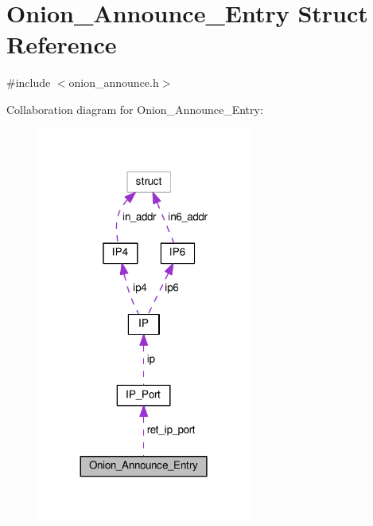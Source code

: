 \hypertarget{struct_onion___announce___entry}{\section{Onion\+\_\+\+Announce\+\_\+\+Entry Struct Reference}
\label{struct_onion___announce___entry}
}


{\ttfamily \#include $<$onion\+\_\+announce.\+h$>$}



Collaboration diagram for Onion\+\_\+\+Announce\+\_\+\+Entry\+:
\nopagebreak
\begin{figure}[H]
\begin{center}
\leavevmode
\includegraphics[width=200pt]{d7/d6b/struct_onion___announce___entry__coll__graph}
\end{center}
\end{figure}
